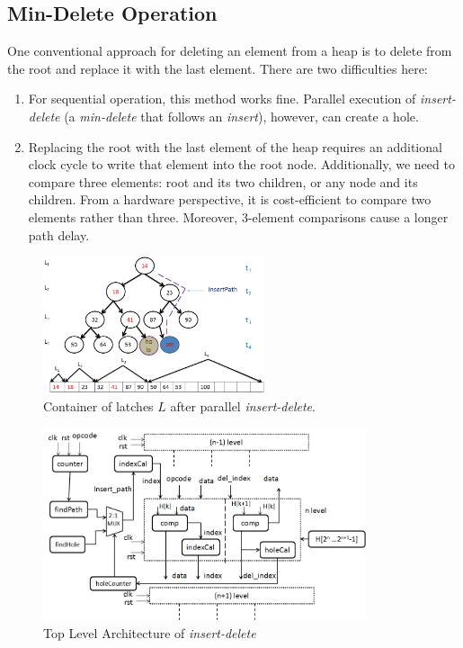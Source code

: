 \subsection{Min-Delete Operation}

One conventional approach for deleting an element from a heap is to delete from the root and replace it with the last element.
There are two difficulties here:

\begin{enumerate}
\item For sequential operation, this method works fine. Parallel execution of {\it insert-delete} (a {\it min-delete} that follows an {\it insert}), however, can create a hole.
\item Replacing the root with the last element of the heap requires an additional clock cycle to write that element into the root node. Additionally, we need to compare three elements: root and its two children, or any node and its children. From a hardware perspective, it is cost-efficient to compare two elements rather than three. Moreover, 3-element comparisons cause a longer path delay.
\end{enumerate}

\begin{figure}[!ht]
  \centering
  \includegraphics[width=6.5cm]{fig/normal-insert-delete-latches.png}
      \caption{Container of latches $L$ after parallel {\it insert-delete}.}
    \label{hole-latches}
\end{figure}

\begin{figure}[!ht]
  \centering
  \includegraphics[width=9.5cm]{fig/2.png}
      \caption{Top Level Architecture of {\it insert-delete}}
    \label{fig10}
\end{figure}

